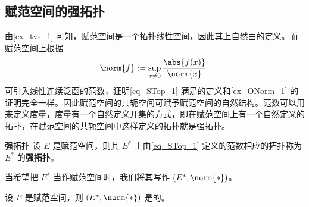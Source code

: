 
\subsection{赋范空间的强拓扑}

由\autoref{ex_tvs_1} 可知，赋范空间是一个拓扑线性空间，因此其上自然由的定义。而赋范空间上根据
\begin{equation}\label{eq_STop_1}
\norm{f}:=\sup_{x\neq0}\frac{\abs{f(x)}}{\norm{x}}~
\end{equation}
可引入线性连续泛函的范数，证明\autoref{eq_STop_1} 满足的定义和\autoref{ex_ONorm_1} 的证明完全一样。因此赋范空间的共轭空间可赋予赋范空间的自然结构。范数可以用来定义度量，度量有一个自然定义开集的方式，即在赋范空间上有一个自然定义的拓扑，在赋范空间的共轭空间中这样定义的拓扑就是强拓扑。
\begin{definition}{强拓扑}
设 $E$ 是赋范空间，则其 $E^*$ 上由\autoref{eq_STop_1} 定义的范数相应的拓扑称为 $E^*$ 的\textbf{强拓扑}。
\end{definition}

当希望把 $E^*$ 当作赋范空间时，我们将其写作 $(E^*,\norm{*})$。

\begin{theorem}{}
设 $E$ 是赋范空间，则 $(E^*,\norm{*})$ 是的。
\end{theorem}




